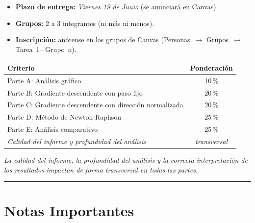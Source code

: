 \documentclass[12pt,a4paper]{article}
\begin{document}
\begin{itemize}[topsep=2pt]
    \item \textbf{Plazo de entrega:} \emph{Viernes 19 de Junio} (se anunciará en
          Canvas).
    \item \textbf{Grupos:} 2 a 3 integrantes (ni más ni menos).
    \item \textbf{Inscripción:} anótense en los grupos de Canvas
          (Personas~$\to$ Grupos~$\to$ Tarea~1\,--\,Grupo~n).
\end{itemize}

\vspace{0.5em}

\begin{center}
\renewcommand{\arraystretch}{1.2}
\begin{tabular}{lc}
\toprule
\textbf{Criterio} & \textbf{Ponderación} \\
\midrule
Parte A: Análisis gráfico                              & 10\,\% \\
Parte B: Gradiente descendente con paso fijo           & 20\,\% \\
Parte C: Gradiente descendente con dirección normalizada & 20\,\% \\
Parte D: Método de Newton-Raphson                      & 25\,\% \\
Parte E: Análisis comparativo                          & 25\,\% \\
\midrule
\textit{Calidad del informe y profundidad del análisis} &
\textit{transversal} \\
\bottomrule
\end{tabular}
\end{center}

\vspace{0.3em}
\noindent\textit{La calidad del informe, la profundidad del análisis y la
correcta interpretación de los resultados impactan de forma transversal en
todas las partes.}

\noindent\rule{\linewidth}{0.4pt}

\section*{Notas Importantes}
\end{document}
